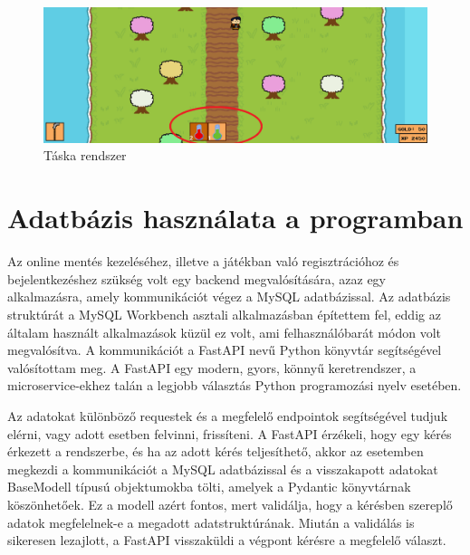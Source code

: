 \begin{figure}[H]
    \centering
    \includegraphics[width=12truecm]{images/inventory.png}
    \caption{Táska rendszer}
    \label{fig:Táska rendszer}
\end{figure}


\section{Adatbázis használata a programban}

 Az online mentés kezeléséhez, illetve a játékban való regisztrációhoz és bejelentkezéshez szükség volt egy backend megvalósítására, azaz egy alkalmazásra, amely kommunikációt végez a MySQL \cite{mysql} adatbázissal. Az adatbázis struktúrát a MySQL Workbench \cite{mysql-workbench} asztali alkalmazásban építettem fel, eddig az általam használt alkalmazások küzül ez volt, ami felhasználóbarát módon volt megvalósítva.  A kommunikációt a FastAPI \cite{fastapi} nevű Python könyvtár segítségével valósítottam meg. A FastAPI egy modern, gyors, könnyű keretrendszer, a microservice-ekhez talán a legjobb választás Python programozási nyelv esetében.

Az adatokat különböző requestek és a megfelelő endpointok segítségével tudjuk elérni, vagy adott esetben felvinni, frissíteni.
 A FastAPI érzékeli, hogy egy kérés érkezett a rendszerbe, és ha az adott kérés teljesíthető,
  akkor az esetemben megkezdi a kommunikációt a MySQL adatbázissal és a visszakapott adatokat BaseModell \cite{basemodell} típusú objektumokba tölti,
   amelyek a Pydantic \cite{pydantic} könyvtárnak köszönhetőek. Ez a modell azért fontos, mert validálja,
    hogy a kérésben szereplő adatok megfelelnek-e a megadott adatstruktúrának.
     Miután a validálás is sikeresen lezajlott, a FastAPI visszaküldi a végpont kérésre a megfelelő választ.

